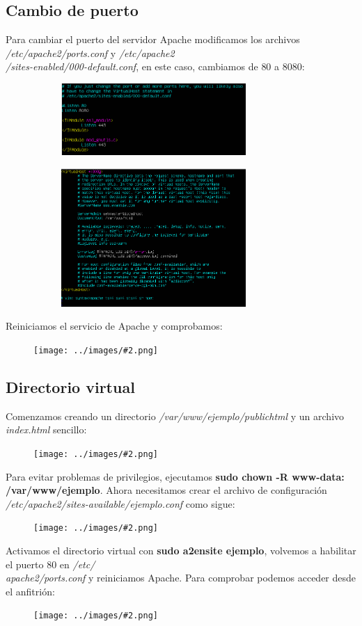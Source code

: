 \documentclass[twoside]{article}
\newcommand{\image}[2]{
\begin{figure}[H]
    \texttt{[image: ../images/\#2.png]}
    \centering
\end{figure}
}
\begin{document}
\subsection{Cambio de puerto}
Para cambiar el puerto del servidor Apache modificamos los archivos \textit{/etc/apache2/ports.conf} y \textit{/etc/apache2\\/sites-enabled/000-default.conf}, en este caso, cambiamos de $80$ a $8080$:
\begin{figure}[H]
    \centering
    \begin{subfigure}{.5\textwidth}
        \centering
        \includegraphics[width=7cm]{../images/19.png}
    \end{subfigure}%
    \begin{subfigure}{.5\textwidth}
        \centering
        \includegraphics[width=7cm]{../images/20.png}
    \end{subfigure}
\end{figure}
Reiniciamos el servicio de Apache y comprobamos:
\image{8}{21}
\subsection{Directorio virtual}
Comenzamos creando un directorio \textit{/var/www/ejemplo/public\textunderscore html} y un archivo \textit{index.html} sencillo:
\image{6}{22}
Para evitar problemas de privilegios, ejecutamos \textbf{sudo chown -R www-data: /var/www/ejemplo}.
Ahora necesitamos crear el archivo de configuración \textit{/etc/apache2/sites-available/ejemplo.conf} como sigue:
\image{8}{23}
Activamos el directorio virtual con \textbf{sudo a2ensite ejemplo}, volvemos a habilitar el puerto $80$ en \textit{/etc/\\apache2/ports.conf} y reiniciamos Apache. Para comprobar podemos acceder desde el anfitrión:
\image{6}{24}
\end{document}
